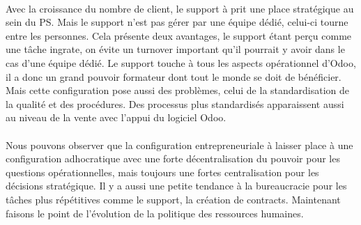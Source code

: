 \paragraph{} Avec la croissance du nombre de client, le support à prit une place stratégique au sein du PS. Mais le support n'est pas gérer par une équipe dédié, celui-ci tourne entre les personnes. Cela présente deux avantages, le support étant perçu comme une tâche ingrate, on évite un turnover important qu'il pourrait y avoir dans le cas d'une équipe dédié. Le support touche à tous les aspects opérationnel d'Odoo, il a donc un grand pouvoir formateur dont tout le monde se doit de bénéficier. Mais cette configuration pose aussi des problèmes, celui de la standardisation de la qualité et des procédures. Des processus plus standardisés apparaissent aussi au niveau de la vente avec l'appui du logiciel Odoo. 

\paragraph{} Nous pouvons observer que la configuration entrepreneuriale à laisser place à une configuration adhocratique\citep[pp. 53-54]{pichault} avec une forte décentralisation du pouvoir pour les questions opérationnelles, mais toujours une fortes centralisation pour les décisions stratégique. Il y a aussi une petite tendance à la bureaucracie pour les tâches plus répétitives comme le support, la création de contracts. Maintenant faisons le point de l'évolution de la politique des ressources humaines. 

